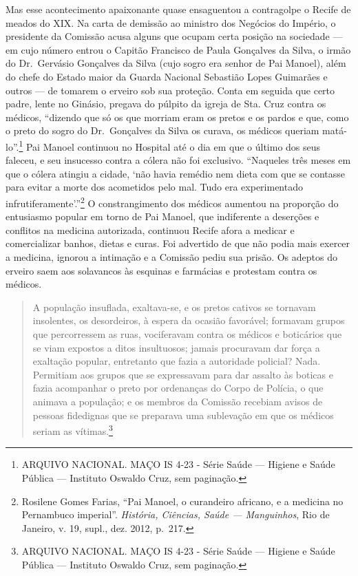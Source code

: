 Mas esse acontecimento apaixonante quase ensaguentou a contragolpe o
Recife de meados do XIX. Na carta de demissão ao ministro dos Negócios
do Império, o presidente da Comissão acusa alguns que ocupam certa
posição na sociedade --- em cujo número entrou o Capitão Francisco de
Paula Gonçalves da Silva, o irmão do Dr.~Gervásio Gonçalves da Silva
(cujo sogro era senhor de Pai Manoel), além do chefe do Estado maior da
Guarda Nacional Sebastião Lopes Guimarães e outros --- de tomarem o
erveiro sob sua proteção. Conta em seguida que certo padre, lente no
Ginásio, pregava do púlpito da igreja de Sta. Cruz contra os médicos,
``dizendo que só os que morriam eram os pretos e os pardos e que, como o
preto do sogro do Dr.~Gonçalves da Silva os curava, os médicos queriam
matá-lo''.\footnote{ARQUIVO NACIONAL. MAÇO IS 4-23 - Série Saúde ---
  Higiene e Saúde Pública --- Instituto Oswaldo Cruz, sem paginação.} Pai
Manoel continuou no Hospital até o dia em que o último dos seus faleceu,
e seu insucesso contra a cólera não foi exclusivo. ``Naqueles três meses
em que o cólera atingiu a cidade, `não havia remédio nem dieta com que
se contasse para evitar a morte dos acometidos pelo mal. Tudo era
experimentado infrutiferamente'.''\footnote{Rosilene Gomes Farias, ``Pai
  Manoel, o curandeiro africano, e a medicina no Pernambuco imperial''.
  \textit{História, Ciências, Saúde --- Manguinhos}, Rio de Janeiro, v. 19,
  supl., dez. 2012, p.~217.} O constrangimento dos médicos aumentou na
proporção do entusiasmo popular em torno de Pai Manoel, que indiferente
a deserções e conflitos na medicina autorizada, continuou Recife afora a
medicar e comercializar banhos, dietas e curas. Foi advertido de que não
podia mais exercer a medicina, ignorou a intimação e a Comissão pediu
sua prisão. Os adeptos do erveiro saem aos solavancos às esquinas e
farmácias e protestam contra os médicos.

\begin{quote}
A população insuflada, exaltava-se, e os pretos cativos se tornavam
insolentes, os desordeiros, à espera da ocasião favorável; formavam
grupos que percorressem as ruas, vociferavam contra os médicos e
boticários que se viam expostos a ditos insultuosos; jamais procuravam
dar força a exaltação popular, entretanto que fazia a autoridade
policial? Nada. Permitiam aos grupos que se expressavam para dar assalto
às boticas e fazia acompanhar o preto por ordenanças do Corpo de
Polícia, o que animava a população; e os membros da Comissão recebiam
avisos de pessoas fidedignas que se preparava uma sublevação em que os
médicos seriam as vítimas.\footnote{ARQUIVO NACIONAL. MAÇO IS 4-23 -
  Série Saúde --- Higiene e Saúde Pública --- Instituto Oswaldo Cruz, sem
  paginação.}
\end{quote}

